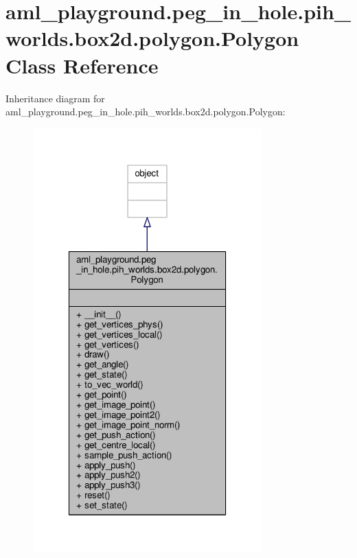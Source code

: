 \hypertarget{classaml__playground_1_1peg__in__hole_1_1pih__worlds_1_1box2d_1_1polygon_1_1_polygon}{\section{aml\-\_\-playground.\-peg\-\_\-in\-\_\-hole.\-pih\-\_\-worlds.\-box2d.\-polygon.\-Polygon Class Reference}
\label{classaml__playground_1_1peg__in__hole_1_1pih__worlds_1_1box2d_1_1polygon_1_1_polygon}
}


Inheritance diagram for aml\-\_\-playground.\-peg\-\_\-in\-\_\-hole.\-pih\-\_\-worlds.\-box2d.\-polygon.\-Polygon\-:
\nopagebreak
\begin{figure}[H]
\begin{center}
\leavevmode
\includegraphics[width=250pt]{classaml__playground_1_1peg__in__hole_1_1pih__worlds_1_1box2d_1_1polygon_1_1_polygon__inherit__graph}
\end{center}
\end{figure}



